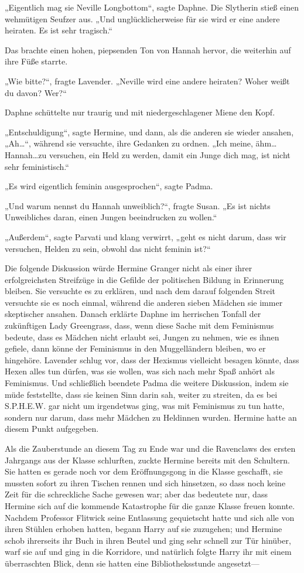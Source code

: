 {„Eigentlich mag sie Neville Longbottom“, sagte Daphne. Die Slytherin stieß einen wehmütigen Seufzer aus. „Und unglücklicherweise für sie wird er eine andere heiraten. Es ist sehr tragisch.“

Das brachte einen hohen, piepsenden Ton von Hannah hervor, die weiterhin auf ihre Füße starrte.

„Wie bitte?“, fragte Lavender. „Neville wird eine andere heiraten? Woher weißt du davon? Wer?“

Daphne schüttelte nur traurig und mit niedergeschlagener Miene den Kopf.

„Entschuldigung“, sagte Hermine, und dann, als die anderen sie wieder ansahen, „Ah…“, während sie versuchte, ihre Gedanken zu ordnen. „Ich meine, ähm…Hannah…zu versuchen, ein Held zu werden, damit ein Junge dich mag, ist nicht sehr feministisch.“

„Es wird eigentlich feminin ausgesprochen“, sagte Padma.

„Und warum nennst du Hannah unweiblich?“, fragte Susan. „Es ist nichts Unweibliches daran, einen Jungen beeindrucken zu wollen.“

„Außerdem“, sagte Parvati und klang verwirrt, „geht es nicht darum, dass wir versuchen, Helden zu sein, obwohl das nicht feminin ist?“

Die folgende Diskussion würde Hermine Granger nicht als einer ihrer erfolgreichsten Streifzüge in die Gefilde der politischen Bildung in Erinnerung bleiben. Sie versuchte es zu erklären, und nach dem darauf folgenden Streit versuchte sie es noch einmal, während die anderen sieben Mädchen sie immer skeptischer ansahen. Danach erklärte Daphne im herrischen Tonfall der zukünftigen Lady Greengrass, dass, wenn diese Sache mit dem Feminismus bedeute, dass es Mädchen nicht erlaubt sei, Jungen zu nehmen, wie es ihnen gefiele, dann könne der Feminismus in den Muggelländern bleiben, wo er hingehöre. Lavender schlug vor, dass der Hexismus vielleicht besagen könnte, dass Hexen alles tun dürfen, was sie wollen, was sich nach mehr Spaß anhört als Feminismus. Und schließlich beendete Padma die weitere Diskussion, indem sie müde feststellte, dass sie keinen Sinn darin sah, weiter zu streiten, da es bei S.P.H.E.W. gar nicht um irgendetwas ging, was mit Feminismus zu tun hatte, sondern nur darum, dass mehr Mädchen zu Heldinnen wurden. Hermine hatte an diesem Punkt aufgegeben.

Als die Zauberstunde an diesem Tag zu Ende war und die Ravenclaws des ersten Jahrgangs aus der Klasse schlurften, zuckte Hermine bereits mit den Schultern. Sie hatten es gerade noch vor dem Eröffnungsgong in die Klasse geschafft, sie mussten sofort zu ihren Tischen rennen und sich hinsetzen, so dass noch keine Zeit für die schreckliche Sache gewesen war; aber das bedeutete nur, dass Hermine sich auf die kommende Katastrophe für die ganze Klasse freuen konnte. Nachdem Professor Flitwick seine Entlassung gequietscht hatte und sich alle von ihren Stühlen erhoben hatten, begann Harry auf sie zuzugehen; und Hermine schob ihrerseits ihr Buch in ihren Beutel und ging sehr schnell zur Tür hinüber, warf sie auf und ging in die Korridore, und natürlich folgte Harry ihr mit einem überraschten Blick, denn sie hatten eine Bibliotheksstunde angesetzt—

}
